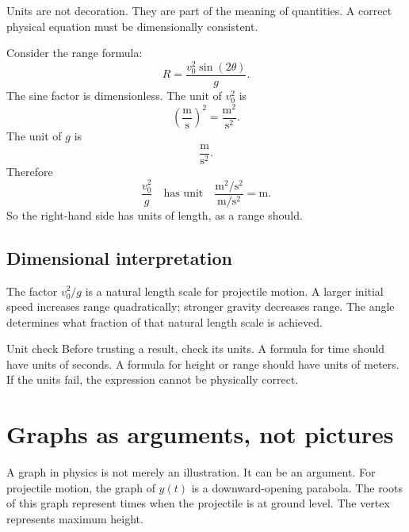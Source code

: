 \documentclass[11pt,a4paper]{article}
\begin{document}
Units are not decoration. They are part of the meaning of quantities. A correct physical equation must be dimensionally consistent.

Consider the range formula:
\[
R=\frac{v_0^2\sin(2\theta)}{g}.
\]
The sine factor is dimensionless. The unit of $v_0^2$ is
\[
\left(\frac{\mathrm{m}}{\mathrm{s}}\right)^2=\frac{\mathrm{m^2}}{\mathrm{s^2}}.
\]
The unit of $g$ is
\[
\frac{\mathrm{m}}{\mathrm{s^2}}.
\]
Therefore
\[
\frac{v_0^2}{g}
\quad\text{has unit}\quad
\frac{\mathrm{m^2/s^2}}{\mathrm{m/s^2}}=\mathrm{m}.
\]
So the right-hand side has units of length, as a range should.

\subsection{Dimensional interpretation}

The factor $v_0^2/g$ is a natural length scale for projectile motion. A larger initial speed increases range quadratically; stronger gravity decreases range. The angle determines what fraction of that natural length scale is achieved.

\begin{methodbox}{Unit check}
Before trusting a result, check its units. A formula for time should have units of seconds. A formula for height or range should have units of meters. If the units fail, the expression cannot be physically correct.
\end{methodbox}

\section{Graphs as arguments, not pictures}

A graph in physics is not merely an illustration. It can be an argument. For projectile motion, the graph of $y(t)$ is a downward-opening parabola. The roots of this graph represent times when the projectile is at ground level. The vertex represents maximum height.

\begin{center}
\end{center}
\end{document}
